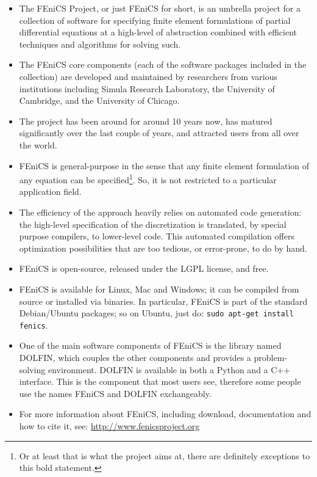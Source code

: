 \documentclass[a4paper, reqno]{amsart}
\numberwithin{equation}{section}
\begin{document}
\begin{itemize}
\item
  The FEniCS Project, or just FEniCS for short, is an umbrella project
  for a collection of software for specifying finite element
  formulations of partial differential equations at a high-level of
  abstraction combined with efficient techniques and algorithms for
  solving such.
\item
  The FEniCS core components (each of the software packages included
  in the collection) are developed and maintained by researchers from
  various institutions including Simula Research Laboratory, the
  University of Cambridge, and the University of Chicago.
\item
  The project has been around for around 10 years now, has matured
  significantly over the last couple of years, and attracted users
  from all over the world.
\item
  FEniCS is general-purpose in the sense that any finite element
  formulation of any equation can be specified\footnote{Or at least
    that is what the project aims at, there are definitely exceptions
    to this bold statement.}. So, it is not restricted to a particular
  application field.
\item
  The efficiency of the approach heavily relies on automated code
  generation: the high-level specification of the discretization is
  translated, by special purpose compilers, to lower-level code. This
  automated compilation offers optimization possibilities that are too
  tedious, or error-prone, to do by hand.
\item
  FEniCS is open-source, released under the LGPL license, and free.
\item
  FEniCS is available for Linux, Mac and Windows; it can be compiled
  from source or installed via binaries. In particular, FEniCS is part
  of the standard Debian/Ubuntu packages; so on Ubuntu, just do:
  \texttt{sudo apt-get install fenics}.
\item
  One of the main software components of FEniCS is the library named
  DOLFIN, which couples the other components and provides a
  problem-solving environment. DOLFIN is available in both a Python
  and a C++ interface.  This is the component that most users see,
  therefore some people use the names FEniCS and DOLFIN exchangeably.
\item
  For more information about FEniCS, including download, documentation
  and how to cite it, see: \url{http://www.fenicsproject.org}

\end{itemize}
\end{document}
